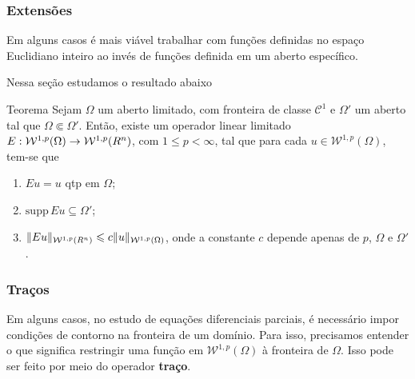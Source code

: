 \documentclass[xcolor=dvipsnames, aspectratio=169, 10pt]{beamer}
\let\mathbb\relax
\newcommand{\bR}{\mathbb{R}}
\newcommand{\cC}{\mathcal{C}}
\newcommand{\cW}{\mathcal{W}}
\newcommand{\supp}{\mathrm{supp}\,}
\begin{document}
\begin{frame}
    \frametitle{Extensões}
    Em alguns casos é mais viável trabalhar com funções definidas no espaço Euclidiano inteiro ao invés de funções definida em um aberto específico.
    
    \pause
    Nessa seção estudamos o resultado abaixo
    \begin{block}{Teorema}
         Sejam $\Omega$ um aberto limitado, com fronteira de classe $\cC^1$ e $\Omega'$ um aberto tal que $\Omega \Subset \Omega'$. Então, existe um operador linear limitado $E : \cW^{1,p}(\Omega) \to \cW^{1,p}(\bR ^n)$, com $1 \leqslant p < \infty$, tal que para cada $u \in \cW^{1,p}(\Omega)$, tem-se que
    \begin{enumerate}[leftmargin=*, label=\textbf{(\alph*)}]
        \item $Eu = u$ qtp em $\Omega$;
        \item $\supp Eu \subseteq \Omega'$;
        \item $\Vert Eu \Vert_{\cW^{1,p}(\bR^n)} \leqslant c \Vert u \Vert_{\cW^{1,p}(\Omega)}$, onde a constante $c$ depende apenas de $p$, $\Omega$ e $\Omega'$.
    \end{enumerate}
    \end{block}
\end{frame}
\begin{frame}
    \frametitle{Traços}

    Em alguns casos, no estudo de equações diferenciais parciais, é necessário impor condições de contorno na fronteira de um domínio. Para isso, precisamos entender o que significa restringir uma função em $\cW^{1,p}(\Omega)$ à fronteira de $\Omega$. Isso pode ser feito por meio do operador \textbf{traço}.
\end{frame}
\end{document}
